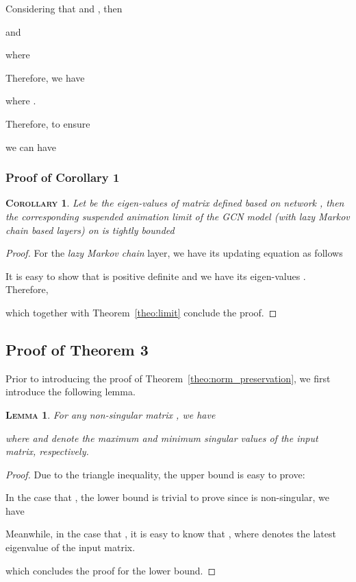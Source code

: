 \documentclass{article}
\newtheorem{appendix_lemma}{\textsc{Lemma}}
\newtheorem{appendix_corollary}{\textsc{Corollary}}
\newcommand{\gcn}{\textsc{GCN}}
\begin{document}
Considering that  and , then

and

where 

Therefore, we have

where .

Therefore, to ensure 

we can have


\subsubsection{Proof of Corollary 1}

\begin{appendix_corollary}
Let  be the eigen-values of matrix  defined based on network , then the corresponding \textit{suspended animation limit} of the {\gcn} model (with \textit{lazy Markov chain} based layers) on  is tightly bounded

\end{appendix_corollary}

\begin{proof}
For the \textit{lazy Markov chain} layer, we have its updating equation as follows

It is easy to show that  is positive definite and we have its eigen-values . Therefore,

which together with Theorem~\ref{theo:limit} conclude the proof.
\end{proof}

\subsection{Proof of Theorem 3}

Prior to introducing the proof of Theorem~\ref{theo:norm_preservation}, we first introduce the following lemma.

\begin{appendix_lemma}
For any non-singular matrix , we have

where  and  denote the maximum and minimum singular values of the input matrix, respectively.
\end{appendix_lemma}
\begin{proof}
Due to the triangle inequality, the upper bound is easy to prove:


In the case that , the lower bound is trivial to prove since  is non-singular, we have

Meanwhile, in the case that , it is easy to know that , where  denotes the latest eigenvalue of the input matrix.

which concludes the proof for the lower bound.
\end{proof}
\end{document}
